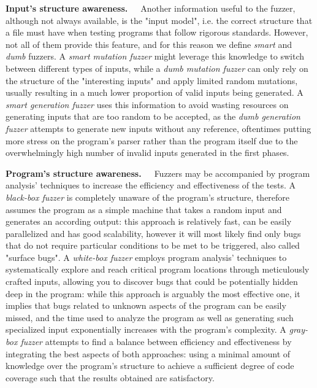 \textbf{Input's structure awareness.}\ \ \ Another information useful to the fuzzer, although not always available, is the "input model", i.e. the correct structure that a file must have when testing programs that follow rigorous standards. However, not all of them provide this feature, and for this reason we define \textit{smart} and \textit{dumb} fuzzers.
A \textit{smart mutation fuzzer} might leverage this knowledge to switch between different types of inputs, while a \textit{dumb mutation fuzzer} can only rely on the structure of the "interesting inputs" and apply limited random mutations, usually resulting in a much lower proportion of valid inputs being generated.
A \textit{smart generation fuzzer} uses this information to avoid wasting resources on generating inputs that are too random to be accepted, as the \textit{dumb generation fuzzer} attempts to generate new inputs without any reference, oftentimes putting more stress on the program's parser rather than the program itself due to the overwhelmingly high number of invalid inputs generated in the first phases.

\textbf{Program's structure awareness.}\ \ \  Fuzzers may be accompanied by program analysis' techniques to increase the efficiency and effectiveness of the tests. A \textit{black-box fuzzer} is completely unaware of the program's structure, therefore assumes the program as a simple machine that takes a random input and generates an according output: this approach is relatively fast, can be easily parallelized and has good scalability, however it will most likely find only bugs that do not require particular conditions to be met to be triggered, also called "surface bugs". A \textit{white-box fuzzer} employs program analysis' techniques to systematically explore and reach critical program locations through meticulously crafted inputs, allowing you to discover bugs that could be potentially hidden deep in the program: while this approach is arguably the most effective one, it implies that bugs related to unknown aspects of the program can be easily missed, and the time used to analyze the program as well as generating such specialized input exponentially increases with the program's complexity.
A \textit{gray-box fuzzer} attempts to find a balance between efficiency and effectiveness by integrating the best aspects of both approaches: using a minimal amount of knowledge over the program's structure to achieve a sufficient degree of code coverage such that the results obtained are satisfactory.



